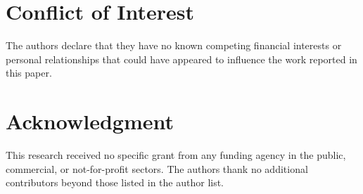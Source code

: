 \documentclass[nolineno]{ieeeaccess}
\begin{document}
\section*{Conflict of Interest}
The authors declare that they have no known competing financial interests
or personal relationships that could have appeared to influence the work
reported in this paper.

\section*{Acknowledgment}
This research received no specific grant from any funding agency in the
public, commercial, or not-for-profit sectors. The authors thank no
additional contributors beyond those listed in the author list.
\end{document}
